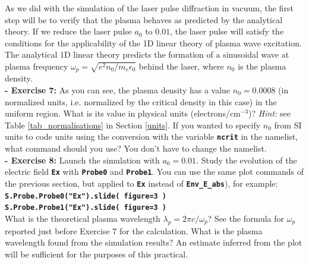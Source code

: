 \documentclass[a4paper,12pt]{extarticle}
\newcommand{\commandline}[1]{\texttt{\textbf{#1}}}
\begin{document}
As we did with the simulation of the laser pulse diffraction in vacuum,  the first step will be to verify that the plasma behaves as predicted by the analytical theory. If we reduce the laser pulse $a_0$ to $0.01$, the laser pulse will satisfy the conditions for the applicability of the 1D linear theory of plasma wave excitation. The  analytical 1D linear theory predicts the formation of a sinusoidal wave at plasma frequency $\omega_p=\sqrt{e^2n_0/m_e\epsilon_0}$ behind the laser, where $n_0$ is the plasma density.\\

\textbf{ - Exercise 7:} As you can see, the plasma density has a value $n_0=0.0008$ (in normalized units, i.e.  normalized by the critical density in this case) in the uniform region.  What is its value in physical units (electrons/cm$^{-3}$)? \textit{Hint:} see Table \ref{tab_normalisations} in Section \ref{units}. If you wanted to specify $n_0$ from SI units to code units using the conversion with the variable \commandline{ncrit} in the namelist, what command should you use? You don't have to change the namelist. \\

\textbf{ - Exercise 8:} Launch the simulation with $a_0=0.01$. Study the evolution of the electric field \commandline{Ex} with \commandline{Probe0} and \commandline{Probe1}. You can use the same plot commands of the previous section, but applied to \commandline{Ex} instead of \commandline{Env\_E\_abs}), for example:\\

\commandline{S.Probe.Probe0("Ex").slide( figure=3 )}\\

\commandline{S.Probe.Probe1("Ex").slide( figure=3 )}\\

What is the theoretical plasma wavelength $\lambda_p=2\pi c/\omega_p$? See the formula for $\omega_p$ reported just before Exercise 7 for the calculation. What is the plasma wavelength found from the simulation results? An estimate inferred from the plot will be sufficient for the purposes of this practical.\\
\end{document}
